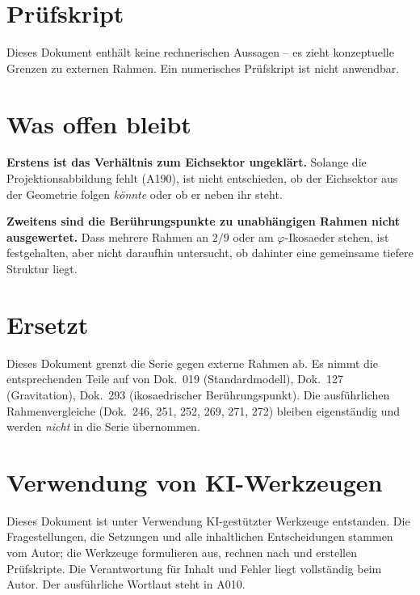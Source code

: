 \section{Prüfskript}

Dieses Dokument enthält keine rechnerischen Aussagen -- es zieht konzeptuelle
Grenzen zu externen Rahmen. Ein numerisches Prüfskript ist nicht anwendbar.

\section{Was offen bleibt}

\textbf{Erstens ist das Verhältnis zum Eichsektor ungeklärt.} Solange die
Projektionsabbildung fehlt (A190), ist nicht entschieden, ob der Eichsektor aus
der Geometrie folgen \emph{könnte} oder ob er neben ihr steht.

\textbf{Zweitens sind die Berührungspunkte zu unabhängigen Rahmen nicht
ausgewertet.} Dass mehrere Rahmen an $2/9$ oder am $\varphi$-Ikosaeder stehen,
ist festgehalten, aber nicht daraufhin untersucht, ob dahinter eine gemeinsame
tiefere Struktur liegt.

\section{Ersetzt}

Dieses Dokument grenzt die Serie gegen externe Rahmen ab. Es nimmt die
entsprechenden Teile auf von Dok.~019 (Standardmodell), Dok.~127 (Gravitation),
Dok.~293 (ikosaedrischer Berührungspunkt). Die ausführlichen Rahmenvergleiche
(Dok.~246, 251, 252, 269, 271, 272) bleiben eigenständig und werden
\emph{nicht} in die Serie übernommen.

\section{Verwendung von KI-Werkzeugen}

Dieses Dokument ist unter Verwendung KI-gestützter Werkzeuge entstanden. Die
Fragestellungen, die Setzungen und alle inhaltlichen Entscheidungen stammen vom
Autor; die Werkzeuge formulieren aus, rechnen nach und erstellen Prüfskripte.
Die Verantwortung für Inhalt und Fehler liegt vollständig beim Autor. Der
ausführliche Wortlaut steht in A010.

